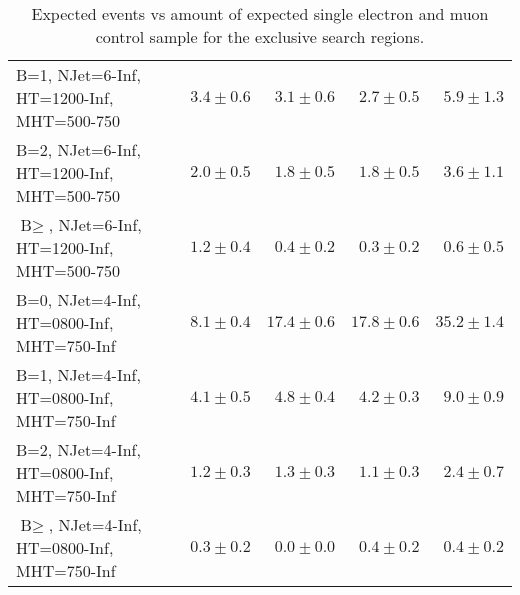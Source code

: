 \begin{table}
\begin{tabular}{l|r|r|r|r}
    B=1, NJet=6-Inf, HT=1200-Inf, MHT=500-750 &               $3.4\pm0.6$&               $3.1\pm0.6$&               $2.7\pm0.5$&                   $5.9\pm1.3$ \\ 
    B=2, NJet=6-Inf, HT=1200-Inf, MHT=500-750 &               $2.0\pm0.5$&               $1.8\pm0.5$&               $1.8\pm0.5$&                   $3.6\pm1.1$ \\ 
    $\text{B}\geq$, NJet=6-Inf, HT=1200-Inf, MHT=500-750 &               $1.2\pm0.4$&               $0.4\pm0.2$&               $0.3\pm0.2$&                   $0.6\pm0.5$ \\ 
    B=0, NJet=4-Inf, HT=0800-Inf, MHT=750-Inf &               $8.1\pm0.4$&              $17.4\pm0.6$&              $17.8\pm0.6$&                  $35.2\pm1.4$ \\ 
    B=1, NJet=4-Inf, HT=0800-Inf, MHT=750-Inf &               $4.1\pm0.5$&               $4.8\pm0.4$&               $4.2\pm0.3$&                   $9.0\pm0.9$ \\ 
    B=2, NJet=4-Inf, HT=0800-Inf, MHT=750-Inf &               $1.2\pm0.3$&               $1.3\pm0.3$&               $1.1\pm0.3$&                   $2.4\pm0.7$ \\ 
    $\text{B}\geq$, NJet=4-Inf, HT=0800-Inf, MHT=750-Inf &               $0.3\pm0.2$&               $0.0\pm0.0$&               $0.4\pm0.2$&                   $0.4\pm0.2$ \\  
    
    \hline
  \end{tabular}
  \normalsize
  \caption{Expected events vs amount of expected single electron and muon control sample for the exclusive search regions.}
  \label{tab:lost-lepton-control-smaple-searchbins}
\end{table}
\normalsize

\normalsize

